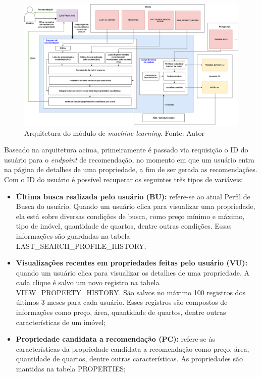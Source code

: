 \begin{figure}
    \centering
    \includegraphics[scale=0.4]{figuras/proposta/sr_nivel3.png}
    \caption[Arquitetura do módulo de \textit{machine learning}]{Arquitetura do módulo de \textit{machine learning}. Fonte: Autor}
    \label{fig:sr_nivel3}
\end{figure}

Baseado na arquitetura acima, primeiramente é passado via requisição o ID do usuário para o \textit{endpoint} de recomendação, no momento em que um usuário entra na página de detalhes de uma propriedade, a fim de ser gerada as recomendações. Com o ID do usuário é possível recuperar os seguintes três tipos de variáveis:

\begin{itemize}
    \item \textbf{Última busca realizada pelo usuário (BU):} refere-se ao atual Perfil de Busca do usuário. Quando um usuário clica para visualizar uma propriedade, ela está sobre diversas condições de busca, como preço mínimo e máximo, tipo de imóvel, quantidade de quartos, dentre outras condições. Essas informações são guardadas na tabela LAST\_SEARCH\_PROFILE\_HISTORY;

    \item \textbf{Visualizações recentes em propriedades feitas pelo usuário (VU):} quando um usuário clica para visualizar os detalhes de uma propriedade. A cada clique é salvo um novo registro na tabela VIEW\_PROPERTY\_HISTORY. São salvos no máximo 100 registros dos últimos 3 meses para cada usuário. Esses registros são compostos de informações como preço, área, quantidade de quartos, dentre outras características de um imóvel;

    \item \textbf{Propriedade candidata a recomendação (PC):} refere-se às características da propriedade candidata a recomendação como preço, área, quantidade de quartos, dentre outras características. As propriedades são mantidas na tabela PROPERTIES;
\end{itemize}

